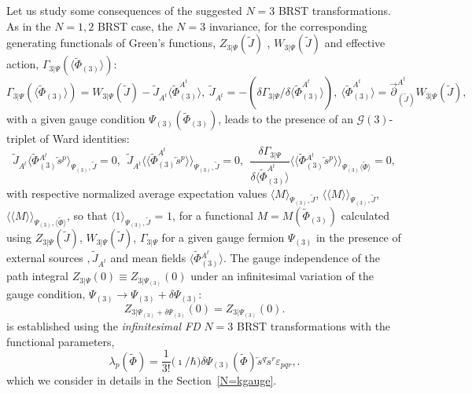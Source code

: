 \documentclass[10pt]{article}
\begin{document}
Let us study some consequences of the suggested $N=3$ BRST transformations.
 As in the $N=1,2$ BRST case, the $N=3$  invariance, for the corresponding generating functionals
of Green's functions, ${Z}_{3|\Psi}(\widetilde{J})$ , ${W}_{3|\Psi}(\widetilde{J})$ and effective action, $\Gamma_{3|\Psi}(\langle\widetilde{\Phi}_{(3)}\rangle)$:
\begin{equation}\label{GFGF3}
\Gamma_{3|\Psi}(\langle\widetilde{\Phi}_{(3)}\rangle) =  {W}_{3|\Psi}(\widetilde{J})- \widetilde{J}_{A^t}\langle \widetilde{\Phi}^{A^t}_{(3)}\rangle, \  \widetilde{J}_{A^t} = - (\delta  \Gamma_{3|\Psi} / \delta \langle \widetilde{\Phi}^{A^t}_{(3)}\rangle),\ \langle \widetilde{\Phi}^{A^t}_{(3)}\rangle = \overrightarrow{\partial}_{(\widetilde{J})}^{A^t} W_{3|\Psi}(\widetilde{J}),
 \end{equation}
with a given gauge condition $\Psi_{(3)}(\widetilde{\Phi}_{(3)})$,
leads to the presence of an $\mathcal{G}(3)$-triplet of Ward identities:
\begin{equation}\label{GFGFWIN3}
\widetilde{J}_{A^t}\langle \widetilde{\Phi}{}^{A^t}_{(3)}\overleftarrow{s}{}^p\rangle_{\Psi_{(3)},\widetilde{J}}=0, \ \ \widetilde{J}_{A^t}\langle\langle \widetilde{\Phi}^{A^t}_{(3)} \overleftarrow{s}{}^p\rangle\rangle_{\Psi_{(3)},\widetilde{J}}=0, \ \ \frac{\delta \Gamma_{3|\Psi}}{\delta \langle \widetilde{\Phi}^{A^t}_{(3)}\rangle}\langle\langle \widetilde{\Phi}{}^{A^t}_{(3)} \overleftarrow{s}{}^p\rangle\rangle_{\Psi_{(3)} \langle \widetilde{\Phi}\rangle} =0,
 \end{equation}
with respective normalized  average expectation values $\langle M \rangle_{\Psi_{(3)},\widetilde{J}}$,
$\langle\langle M\rangle\rangle_{\Psi_{(3)},\widetilde{J}}$, $\langle\langle M\rangle\rangle_{\Psi_{(3)}, \langle \widetilde{\Phi}\rangle}$, so that $\langle 1 \rangle_{\Psi_{(3)},\widetilde{J}}$ = $1$,
for a functional $M=M(\widetilde{\Phi}_{(3)})$ calculated using ${Z}_{3|\Psi}(\widetilde{J})$, ${W}_{3|\Psi}(\widetilde{J})$, $\Gamma_{3|\Psi}$
for a given gauge fermion $\Psi_{(3)}$ in the presence of external sources $,\widetilde{J}_{A^t}$ and mean fields
$\langle \widetilde{\Phi}{}^{A^t}_{(3)}\rangle$. The gauge independence of the path integral $Z_{3|\Psi}(0)\equiv Z_{3|\Psi_{(3)}}(0)$
under an infinitesimal variation of the gauge condition, $\Psi_{(3)} \to \Psi_{(3)}+\delta \Psi_{(3)}$:
\begin{equation}\label{N3GIinf}
  Z_{3|\Psi_{(3)}+\delta \Psi_{(3)}}(0) =     Z_{3|\Psi_{(3)}}(0).
\end{equation}
is established using the \emph{infinitesimal FD} $N=3$ BRST transformations
 with the functional parameters,
  \begin{equation}\label{N3FDP}
 \lambda_p(\widetilde{\Phi})= \frac{1}{3!}\big(\imath / \hbar\big) \delta \Psi_{(3)}(\widetilde{\Phi}) \overleftarrow{s}{}^q\overleftarrow{s}{}^r \varepsilon_{pqr},
.\end{equation}
 which we consider in details   in the Section~\ref{N=kgauge}.
\end{document}
